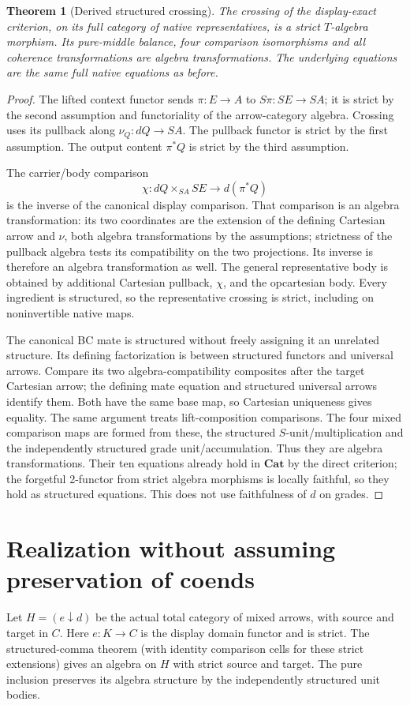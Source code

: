 \documentclass[11pt]{article}
\newtheorem{theorem}{Theorem}
\begin{document}
\begin{theorem}[Derived structured crossing]
The crossing of the display-exact criterion, on its full category of native representatives, is a strict $T$-algebra morphism. Its pure-middle balance, four comparison isomorphisms and all coherence transformations are algebra transformations. The underlying equations are the same full native equations as before.
\end{theorem}
\begin{proof}
The lifted context functor sends $\pi:E\to A$ to $S\pi:SE\to SA$; it is strict by the second assumption and functoriality of the arrow-category algebra. Crossing uses its pullback along $\nu_Q:dQ\to SA$. The pullback functor is strict by the first assumption. The output content $\pi^*Q$ is strict by the third assumption.

The carrier/body comparison
\[
 \chi:dQ\times_{SA}SE\longrightarrow d(\pi^*Q)
\]
is the inverse of the canonical display comparison. That comparison is an algebra transformation: its two coordinates are the extension of the defining Cartesian arrow and $\nu$, both algebra transformations by the assumptions; strictness of the pullback algebra tests its compatibility on the two projections. Its inverse is therefore an algebra transformation as well. The general representative body is obtained by additional Cartesian pullback, $\chi$, and the opcartesian body. Every ingredient is structured, so the representative crossing is strict, including on noninvertible native maps.

The canonical BC mate is structured without freely assigning it an unrelated structure. Its defining factorization is between structured functors and universal arrows. Compare its two algebra-compatibility composites after the target Cartesian arrow; the defining mate equation and structured universal arrows identify them. Both have the same base map, so Cartesian uniqueness gives equality. The same argument treats lift-composition comparisons. The four mixed comparison maps are formed from these, the structured $S$-unit/multiplication and the independently structured grade unit/accumulation. Thus they are algebra transformations. Their ten equations already hold in $\mathbf{Cat}$ by the direct criterion; the forgetful 2-functor from strict algebra morphisms is locally faithful, so they hold as structured equations. This does not use faithfulness of $d$ on grades.
\end{proof}

\section{Realization without assuming preservation of coends}
Let $H=(e\downarrow d)$ be the actual total category of mixed arrows, with source and target in $C$. Here $e:K\to C$ is the display domain functor and is strict. The structured-comma theorem (with identity comparison cells for these strict extensions) gives an algebra on $H$ with strict source and target. The pure inclusion preserves its algebra structure by the independently structured unit bodies.
\end{document}
